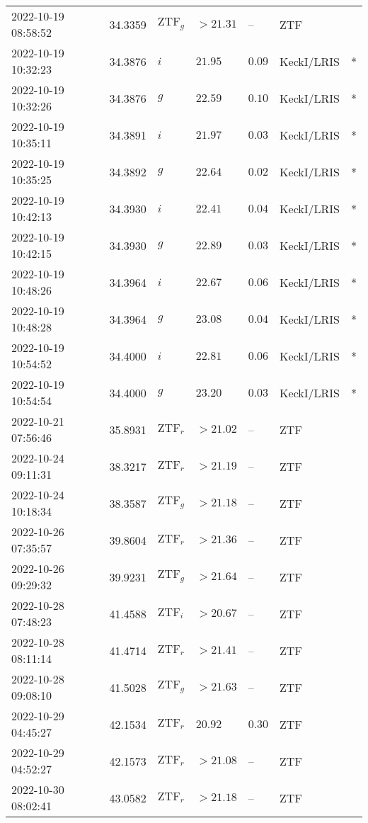 \documentclass{nature_plusfigure}
\begin{document}
\begin{supplement}
\begin{center}
\begin{longtable}{lllllll}
2022-10-19 08:58:52 & 34.3359 & $\mathrm{ZTF}_{g}$ & $>21.31$ & -- & ZTF &  \\ 
2022-10-19 10:32:23 & 34.3876 & $i$ & $21.95$ & $0.09$ & KeckI/LRIS & * \\ 
2022-10-19 10:32:26 & 34.3876 & $g$ & $22.59$ & $0.10$ & KeckI/LRIS & * \\ 
2022-10-19 10:35:11 & 34.3891 & $i$ & $21.97$ & $0.03$ & KeckI/LRIS & * \\ 
2022-10-19 10:35:25 & 34.3892 & $g$ & $22.64$ & $0.02$ & KeckI/LRIS & * \\ 
2022-10-19 10:42:13 & 34.3930 & $i$ & $22.41$ & $0.04$ & KeckI/LRIS & * \\ 
2022-10-19 10:42:15 & 34.3930 & $g$ & $22.89$ & $0.03$ & KeckI/LRIS & * \\ 
2022-10-19 10:48:26 & 34.3964 & $i$ & $22.67$ & $0.06$ & KeckI/LRIS & * \\ 
2022-10-19 10:48:28 & 34.3964 & $g$ & $23.08$ & $0.04$ & KeckI/LRIS & * \\ 
2022-10-19 10:54:52 & 34.4000 & $i$ & $22.81$ & $0.06$ & KeckI/LRIS & * \\ 
2022-10-19 10:54:54 & 34.4000 & $g$ & $23.20$ & $0.03$ & KeckI/LRIS & * \\ 
2022-10-21 07:56:46 & 35.8931 & $\mathrm{ZTF}_{r}$ & $>21.02$ & -- & ZTF &  \\ 
2022-10-24 09:11:31 & 38.3217 & $\mathrm{ZTF}_{r}$ & $>21.19$ & -- & ZTF &  \\ 
2022-10-24 10:18:34 & 38.3587 & $\mathrm{ZTF}_{g}$ & $>21.18$ & -- & ZTF &  \\ 
2022-10-26 07:35:57 & 39.8604 & $\mathrm{ZTF}_{r}$ & $>21.36$ & -- & ZTF &  \\ 
2022-10-26 09:29:32 & 39.9231 & $\mathrm{ZTF}_{g}$ & $>21.64$ & -- & ZTF &  \\ 
2022-10-28 07:48:23 & 41.4588 & $\mathrm{ZTF}_{i}$ & $>20.67$ & -- & ZTF &  \\ 
2022-10-28 08:11:14 & 41.4714 & $\mathrm{ZTF}_{r}$ & $>21.41$ & -- & ZTF &  \\ 
2022-10-28 09:08:10 & 41.5028 & $\mathrm{ZTF}_{g}$ & $>21.63$ & -- & ZTF &  \\ 
2022-10-29 04:45:27 & 42.1534 & $\mathrm{ZTF}_{r}$ & $20.92$ & $0.30$ & ZTF &  \\ 
2022-10-29 04:52:27 & 42.1573 & $\mathrm{ZTF}_{r}$ & $>21.08$ & -- & ZTF &  \\ 
2022-10-30 08:02:41 & 43.0582 & $\mathrm{ZTF}_{r}$ & $>21.18$ & -- & ZTF &  \\ 

\end{longtable}
\end{center}
\end{supplement}
\end{document}
